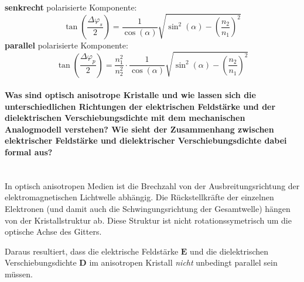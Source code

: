\documentclass[a4paper, 11pt, ngerman, parskip=half-]{scrartcl}
\newcommand{\myparagraph}[1]{\paragraph{#1}\mbox{}\\}
\begin{document}
%
\textbf{senkrecht} polarisierte Komponente:
%
\begin{equation}
    \label{eq:totalreflexion_s_polarisation}
    \tan(\frac{\Delta \varphi_s}{2}) = \frac{1}{\cos(\alpha)} \sqrt{\sin^2(\alpha) - \left(\frac{n_2}{n_1}\right)^2}
\end{equation}
%
\textbf{parallel} polarisierte Komponente:
%
\begin{equation}
    \label{eq:totalreflexion_p_polarisation}
    \tan(\frac{\Delta \varphi_p}{2}) = \frac{n_1^2}{n_2^2} \cdot \frac{1}{\cos(\alpha)} \sqrt{\sin^2(\alpha) - \left(\frac{n_2}{n_1}\right)^2}
\end{equation}


\myparagraph{Was sind optisch anisotrope Kristalle und wie lassen sich die unterschiedlichen Richtungen der elektrischen Feldstärke und der dielektrischen Verschiebungsdichte mit dem mechanischen Analogmodell verstehen? Wie sieht der Zusammenhang zwischen elektrischer Feldstärke und dielektrischer Verschiebungsdichte dabei formal aus?}
%
In optisch anisotropen Medien ist die Brechzahl von der Ausbreitungsrichtung der elektromagnetischen Lichtwelle abhängig. Die Rückstellkräfte der einzelnen Elektronen (und damit auch die Schwingungsrichtung der Gesamtwelle) hängen von der Kristallstruktur ab. Diese Struktur ist nicht rotationssymetrisch um die optische Achse des Gitters.

Daraus resultiert, dass die elektrische Feldstärke $\textbf{E}$ und die dielektrischen Verschiebungsdichte $\textbf{D}$ im anisotropen Kristall \textit{nicht} unbedingt parallel sein müssen.
\end{document}
